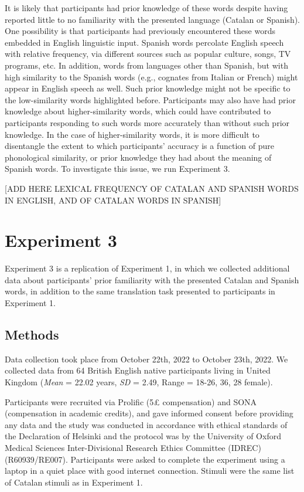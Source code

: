 \documentclass[
]{article}
\begin{document}
It is likely that participants had prior knowledge of these words
despite having reported little to no familiarity with the presented
language (Catalan or Spanish). One possibility is that participants had
previously encountered these words embedded in English linguistic input.
Spanish words percolate English speech with relative frequency, via
different sources such as popular culture, songs, TV programs, etc. In
addition, words from languages other than Spanish, but with high
similarity to the Spanish words (e.g., cognates from Italian or French)
might appear in English speech as well. Such prior knowledge might not
be specific to the low-similarity words highlighted before. Participants
may also have had prior knowledge about higher-similarity words, which
could have contributed to participants responding to such words more
accurately than without such prior knowledge. In the case of
higher-similarity words, it is more difficult to disentangle the extent
to which participants' accuracy is a function of pure phonological
similarity, or prior knowledge they had about the meaning of Spanish
words. To investigate this issue, we run Experiment 3.

{[}ADD HERE LEXICAL FREQUENCY OF CATALAN AND SPANISH WORDS IN ENGLISH,
AND OF CATALAN WORDS IN SPANISH{]}

\section{Experiment 3}\label{experiment-3}

Experiment 3 is a replication of Experiment 1, in which we collected
additional data about participants' prior familiarity with the presented
Catalan and Spanish words, in addition to the same translation task
presented to participants in Experiment 1.

\subsection{Methods}\label{methods-2}

Data collection took place from October 22th, 2022 to October 23th,
2022. We collected data from 64 British English native participants
living in United Kingdom (\emph{Mean} = 22.02 years, \emph{SD} = 2.49,
Range = 18-26, 36, 28 female).

Participants were recruited via Prolific (5£ compensation) and SONA
(compensation in academic credits), and gave informed consent before
providing any data and the study was conducted in accordance with
ethical standards of the Declaration of Helsinki and the protocol was by
the University of Oxford Medical Sciences Inter-Divisional Research
Ethics Committee (IDREC) (R60939/RE007). Participants were asked to
complete the experiment using a laptop in a quiet place with good
internet connection. Stimuli were the same list of Catalan stimuli as in
Experiment 1.
\end{document}
